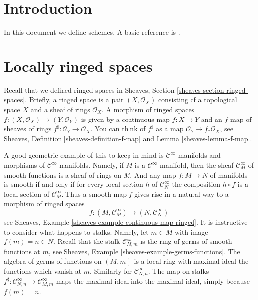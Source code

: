 \section{Introduction}
\label{schemes-section-introduction}
In this document we define schemes.
A basic reference is \cite{EGA}.

\section{Locally ringed spaces}
\label{schemes-section-locally-ringed-spaces}
Recall that we defined ringed spaces
in Sheaves, Section \ref{sheaves-section-ringed-spaces}.
Briefly, a ringed space is a pair $(X, \mathcal{O}_X)$ consisting
of a topological space $X$ and a sheaf of rings $\mathcal{O}_X$.
A morphism of ringed spaces $f : (X, \mathcal{O}_X) \to (Y, \mathcal{O}_Y)$
is given by a continuous map $f : X \to Y$ and an $f$-map of sheaves
of rings $f^\sharp : \mathcal{O}_Y \to \mathcal{O}_X$. You can
think of $f^\sharp$ as a map $\mathcal{O}_Y \to f_*\mathcal{O}_X$, see
Sheaves, Definition \ref{sheaves-definition-f-map} and
Lemma \ref{sheaves-lemma-f-map}.

\medskip\noindent
A good geometric example of this to keep in mind is
$\mathcal{C}^\infty$-manifolds and morphisms of
$\mathcal{C}^\infty$-manifolds. Namely, if $M$ is a
$\mathcal{C}^\infty$-manifold, then the sheaf $\mathcal{C}^\infty_M$
of smooth functions is a sheaf of rings on $M$. And any
map $f : M \to N$ of manifolds is smooth if and only if
for every local section $h$ of $\mathcal{C}^\infty_N$
the composition $h \circ f$ is a local section of $\mathcal{C}^\infty_M$.
Thus a smooth map $f$ gives rise in a natural way to a morphism
of ringed spaces
$$
f : (M , \mathcal{C}^\infty_M) \longrightarrow (N, \mathcal{C}^\infty_N)
$$
see Sheaves, Example \ref{sheaves-example-continuous-map-ringed}.
It is instructive to consider what happens to stalks. Namely, let
$m \in M$ with image $f(m) = n \in N$. Recall that the stalk
$\mathcal{C}^\infty_{M, m}$ is the ring of germs of smooth
functions at $m$, see
Sheaves, Example \ref{sheaves-example-germs-functions}.
The algebra of germs of functions on $(M, m)$ is a local ring with maximal
ideal the functions which vanish at $m$.
Similarly for $\mathcal{C}^\infty_{N, n}$. The map on stalks
$f^\sharp : \mathcal{C}^\infty_{N, n} \to \mathcal{C}^\infty_{M, m}$
maps the maximal ideal into the maximal ideal, simply
because $f(m) = n$.

